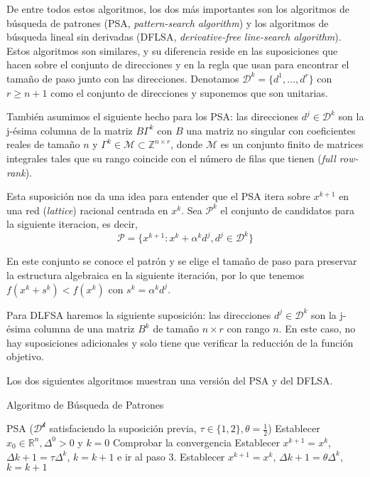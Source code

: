 De entre todos estos algoritmos, los dos más importantes son los algoritmos de búsqueda de patrones (PSA, \textit{pattern-search algorithm}) y los algoritmos de búsqueda lineal sin derivadas (DFLSA, \textit{derivative-free line-search algorithm}). 
Estos algoritmos son similares, y su diferencia reside en las suposiciones que hacen sobre el conjunto de direcciones y en la regla que usan para encontrar el tamaño de paso junto con las direcciones. 
Denotamos $\mathcal{D}^k = \{d^1,...,d^r\}$ con $r\geq n+1$ como el conjunto de direcciones y suponemos que son unitarias. 

También asumimos el siguiente hecho para los PSA: las direcciones $d^j\in\mathcal{D}^k$ son la j-ésima columna de la matriz $B\Gamma^k$ con $B$ una matriz no singular con coeficientes reales de tamaño $n$ y $\Gamma^k\in\mathcal{M}\subset \mathbb{Z}^{n\times r}$, donde $\mathcal{M}$ es un conjunto finito	de matrices integrales tales que su rango coincide con el número de filas que tienen (\textit{full row-rank}).

Esta suposición nos da una idea para entender que el PSA itera sobre $x^{k+1}$ en una red (\textit{lattice}) racional centrada en $x^k$. 
Sea $\mathcal{P}^k$ el conjunto de candidatos para la siguiente iteracion, es decir, 
\begin{equation*}
\mathcal{P} = \{x^{k+1} : x^k + \alpha^kd^j, d^j\in\mathcal{D}^k\}
\end{equation*}

En este conjunto se conoce el patrón y se elige el tamaño de paso para preservar la estructura algebraica en la siguiente iteración, por lo que tenemos $f(x^k+s^k) < f(x^k)$ con $s^k = \alpha^k d^j$.

Para DLFSA haremos la siguiente suposición: las direcciones $d^j\in\mathcal{D}^k$  son la j-ésima columna de una matriz $B^k$ de tamaño $n\times r$ con rango $n$. 
En este caso, no hay suposiciones adicionales y solo tiene que verificar la reducción de la función objetivo. 

Los dos siguientes algoritmos muestran una versión del PSA y del DFLSA.

\begin{algorithm}[H]
\caption{Algoritmo de Búsqueda de Patrones}\label{alg:PSA}
\begin{algorithmic}[1]
\Procedure \textsc{PSA} ($\mathcal{D^k}$ satisfaciendo la suposición previa, $\tau\in\{1,2\}, \theta=\frac{1}{2}$)
\State Establecer $x_0\in\mathbb{R}^n, \Delta^0>0$ y $k=0$
\State Comprobar la convergencia
	\State Establecer $x^{k+1} = x^k$, $\Delta k+1 = \tau\Delta^k$, $k=k+1$ e ir al paso 3.
\Else
	\State Establecer $x^{k+1} = x^k$, $\Delta k+1=\theta\Delta^k$, $k = k+1$ 
\EndIf
\EndProcedure
\end{algorithmic}
\end{algorithm}


